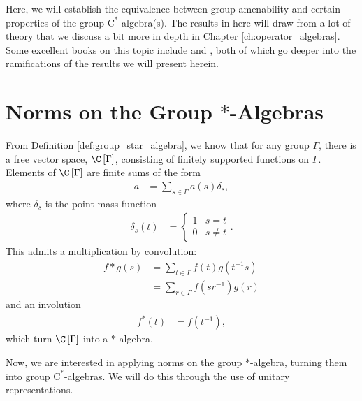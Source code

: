 Here, we will establish the equivalence between group amenability and certain properties of the group $\mathrm{C}^{\ast}$-algebra(s). The results in here will draw from a lot of theory that we discuss a bit more in depth in Chapter \ref{ch:operator_algebras}. Some excellent books on this topic include \cite{brown_and_ozawa} and \cite{completely_bounded_maps_and_operator_algebras}, both of which go deeper into the ramifications of the results we will present herein.
\section{Norms on the Group \texorpdfstring{$\ast$-Algebras}{*-Algebras}}%
From Definition \ref{def:group_star_algebra}, we know that for any group $\Gamma$, there is a free vector space, $\C\left[ \Gamma \right]$, consisting of finitely supported functions on $\Gamma$. Elements of $\C\left[ \Gamma \right]$ are finite sums of the form
\begin{align*}
  a &= \sum_{s\in\Gamma}a(s)\delta_s,
\end{align*}
where $\delta_s$ is the point mass function
\begin{align*}
  \delta_s\left( t \right) &= \begin{cases}
    1 & s = t\\
    0 & s\neq t
  \end{cases}.
\end{align*}
This admits a multiplication by convolution:
\begin{align*}
  f\ast g(s) &= \sum_{t\in\Gamma}f(t)g\left( t^{-1}s \right)\\
              &= \sum_{r\in\Gamma}f\left( sr^{-1} \right)g\left( r \right)
\end{align*}
and an involution
\begin{align*}
  f^{\ast}\left( t \right) &= \overline{f\left( t^{-1} \right)},
\end{align*}
which turn $\C\left[ \Gamma \right]$ into a $\ast$-algebra.\newline

Now, we are interested in applying norms on the group $\ast$-algebra, turning them into group $\mathrm{C}^{\ast}$-algebras. We will do this through the use of unitary representations.\newline

